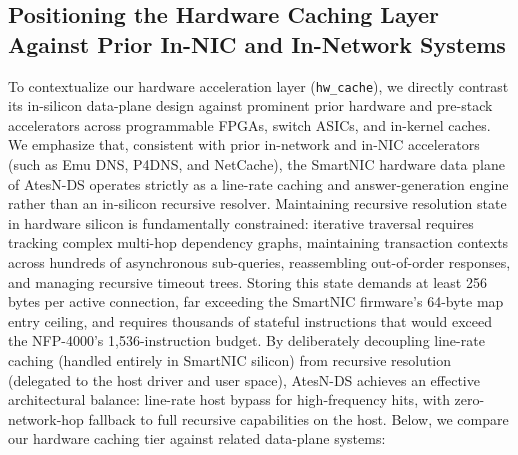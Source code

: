 \documentclass[a4paper,fleqn,colorlinks,hidelinks]{cas-sc}
\begin{document}
\subsection{Positioning the Hardware Caching Layer Against Prior In-NIC and In-Network Systems}
\label{sec:positioning_prior_work}

To contextualize our hardware acceleration layer (\texttt{hw\_cache}), we directly contrast its in-silicon data-plane design against prominent prior hardware and pre-stack accelerators across programmable FPGAs, switch ASICs, and in-kernel caches. We emphasize that, consistent with prior in-network and in-NIC accelerators (such as Emu DNS, P4DNS, and NetCache), the SmartNIC hardware data plane of AtesN-DS operates strictly as a line-rate caching and answer-generation engine rather than an in-silicon recursive resolver. Maintaining recursive resolution state in hardware silicon is fundamentally constrained: iterative traversal requires tracking complex multi-hop dependency graphs, maintaining transaction contexts across hundreds of asynchronous sub-queries, reassembling out-of-order responses, and managing recursive timeout trees. Storing this state demands at least 256 bytes per active connection, far exceeding the SmartNIC firmware's 64-byte map entry ceiling, and requires thousands of stateful instructions that would exceed the NFP-4000's 1,536-instruction budget. By deliberately decoupling line-rate caching (handled entirely in SmartNIC silicon) from recursive resolution (delegated to the host driver and user space), AtesN-DS achieves an effective architectural balance: line-rate host bypass for high-frequency hits, with zero-network-hop fallback to full recursive capabilities on the host. Below, we compare our hardware caching tier against related data-plane systems:
\end{document}
